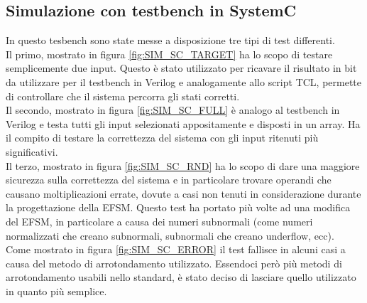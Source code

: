 \documentclass[]{IEEEtran}
\begin{document}
\subsection{Simulazione con testbench in SystemC}
In questo tesbench sono state messe a disposizione tre tipi di test differenti.
\\Il primo, mostrato in figura \ref{fig:SIM_SC_TARGET} ha lo scopo di testare semplicemente due input. Questo è stato utilizzato per ricavare il risultato in bit da utilizzare per il testbench in Verilog e analogamente allo script TCL, permette di controllare che il sistema percorra gli stati corretti.
\\Il secondo, mostrato in figura \ref{fig:SIM_SC_FULL} è analogo al testbench in Verilog e testa tutti gli input selezionati appositamente e disposti in un array. Ha il compito di testare la correttezza del sistema con gli input ritenuti più significativi.
\\Il terzo, mostrato in figura \ref{fig:SIM_SC_RND} ha lo scopo di dare una maggiore sicurezza sulla correttezza del sistema e in particolare trovare operandi che causano moltiplicazioni errate, dovute a casi non tenuti in considerazione durante la progettazione della EFSM. Questo test ha portato più volte ad una modifica del EFSM, in particolare a causa dei numeri subnormali (come numeri normalizzati che creano subnormali, subnormali che creano underflow, ecc).
\\Come mostrato in figura \ref{fig:SIM_SC_ERROR} il test fallisce in alcuni casi a causa del metodo di arrotondamento utilizzato. Essendoci però più metodi di arrotondamento usabili nello standard, è stato deciso di lasciare quello utilizzato in quanto più semplice.
\end{document}
